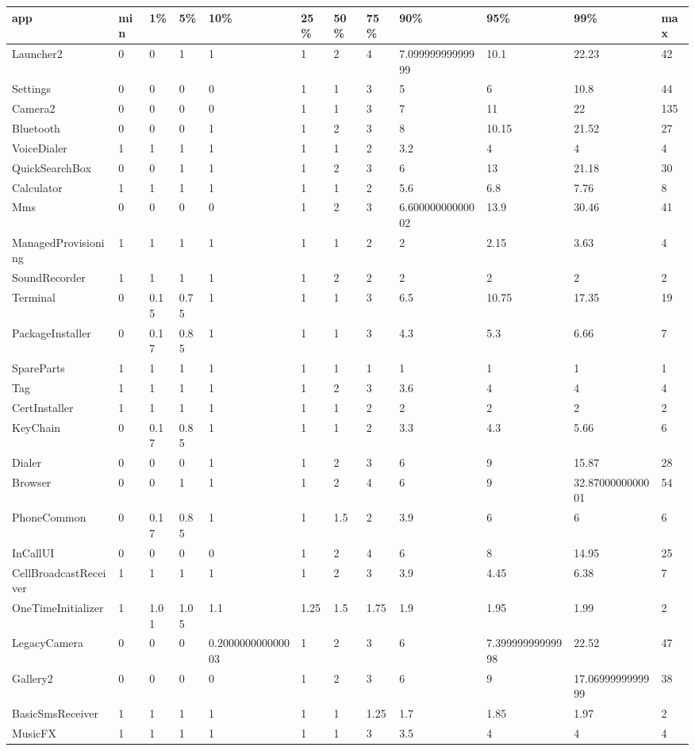 \begin{tabular}{|l|l|l|l|l|l|l|l|l|l|l|l|}
\hline
app&min&1\%&5\%&10\%&25\%&50\%&75\%&90\%&95\%&99\%&max\\
\hline
Launcher2&0&0&1&1&1&2&4&7.09999999999999&10.1&22.23&42\\
\hline
Settings&0&0&0&0&1&1&3&5&6&10.8&44\\
\hline
Camera2&0&0&0&0&1&1&3&7&11&22&135\\
\hline
Bluetooth&0&0&0&1&1&2&3&8&10.15&21.52&27\\
\hline
VoiceDialer&1&1&1&1&1&1&2&3.2&4&4&4\\
\hline
QuickSearchBox&0&0&1&1&1&2&3&6&13&21.18&30\\
\hline
Calculator&1&1&1&1&1&1&2&5.6&6.8&7.76&8\\
\hline
Mms&0&0&0&0&1&2&3&6.60000000000002&13.9&30.46&41\\
\hline
ManagedProvisioning&1&1&1&1&1&1&2&2&2.15&3.63&4\\
\hline
SoundRecorder&1&1&1&1&1&2&2&2&2&2&2\\
\hline
Terminal&0&0.15&0.75&1&1&1&3&6.5&10.75&17.35&19\\
\hline
PackageInstaller&0&0.17&0.85&1&1&1&3&4.3&5.3&6.66&7\\
\hline
SpareParts&1&1&1&1&1&1&1&1&1&1&1\\
\hline
Tag&1&1&1&1&1&2&3&3.6&4&4&4\\
\hline
CertInstaller&1&1&1&1&1&1&2&2&2&2&2\\
\hline
KeyChain&0&0.17&0.85&1&1&1&2&3.3&4.3&5.66&6\\
\hline
Dialer&0&0&0&1&1&2&3&6&9&15.87&28\\
\hline
Browser&0&0&1&1&1&2&4&6&9&32.8700000000001&54\\
\hline
PhoneCommon&0&0.17&0.85&1&1&1.5&2&3.9&6&6&6\\
\hline
InCallUI&0&0&0&0&1&2&4&6&8&14.95&25\\
\hline
CellBroadcastReceiver&1&1&1&1&1&2&3&3.9&4.45&6.38&7\\
\hline
OneTimeInitializer&1&1.01&1.05&1.1&1.25&1.5&1.75&1.9&1.95&1.99&2\\
\hline
LegacyCamera&0&0&0&0.200000000000003&1&2&3&6&7.39999999999998&22.52&47\\
\hline
Gallery2&0&0&0&0&1&2&3&6&9&17.0699999999999&38\\
\hline
BasicSmsReceiver&1&1&1&1&1&1&1.25&1.7&1.85&1.97&2\\
\hline
MusicFX&1&1&1&1&1&1&3&3.5&4&4&4\\
\hline

\end{tabular}
